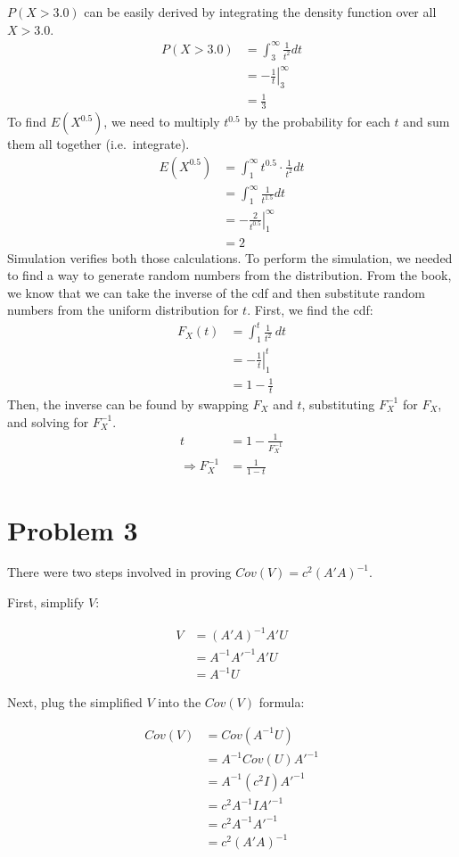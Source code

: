 \documentclass{article}
\begin{document}
$P( X > 3.0 )$ can be easily derived by integrating the density function over
all $X > 3.0$.
\begin{align*}
  P( X > 3.0 ) &= \int_{3}^{\infty} \frac{1}{t^2} dt \\
               &= \left.-\frac{1}{t} \right|_3^\infty \\
               &= \frac{1}{3}
\end{align*}
To find $E(X^{0.5})$, we need to multiply $t^{0.5}$ by the probability for each
$t$ and sum them all together (i.e.\ integrate).
\begin{align*}
  E( X^{0.5} ) &= \int_1^\infty t^{0.5}\cdot\frac{1}{t^2} dt \\
  &= \int_1^\infty \frac{1}{t^{1.5}} dt \\
  &=\left. - \frac{2}{t^{0.5}} \right|_1^\infty \\
  &= 2
\end{align*}
Simulation verifies both those calculations. To perform the simulation, we needed to
find a way to generate random numbers from the distribution. From the book, we
know that we can take the inverse of the cdf and then substitute random
numbers from the uniform distribution for $t$. First, we find the cdf:
\begin{align*}
  F_X(t) &= \int_1^t \frac{1}{t^2} \ dt \\
         &= \left. - \frac{1}{t} \right|_1^t \\
         &= 1 - \frac{1}{t}
\end{align*}
Then, the inverse can be found by swapping $F_X$ and $t$, substituting
$F_X^{-1}$ for $F_X$, and solving for $F_X^{-1}$.
\begin{align*}
  t &= 1 - \frac{1}{F_X^{-1}} \\
  \Rightarrow F_X^{-1} &= \frac{1}{1 - t}
\end{align*}

\section*{Problem 3}

There were two steps involved in proving $Cov(V) = c^{2}(A'A)^{-1}$.

First, simplify $V$:

\begin{align*}
  V &= (A'A)^{-1}A'U \\
    &= A^{-1}A'^{-1}A'U \\
    &= A^{-1}U
\end{align*}

Next, plug the simplified $V$ into the $Cov(V)$ formula:

\begin{align*}
  Cov(V) &= Cov(A^{-1}U) \\
         &= A^{-1}Cov(U)A'^{-1} \\
         &= A^{-1}(c^{2}I)A'^{-1} \\
         &= c^{2}A^{-1}IA'^{-1} \\
         &= c^{2}A^{-1}A'^{-1} \\
         &= c^{2}(A'A)^{-1}
\end{align*}
\end{document}
